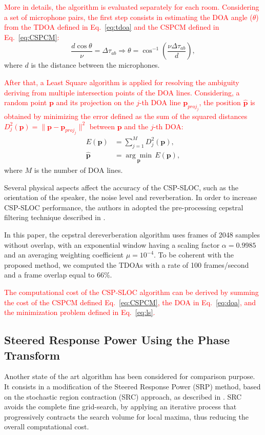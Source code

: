 \documentclass[review]{elsarticle}
\let\originaleqref=\eqref
\renewcommand{\eqref}{Eq.~\originaleqref}
\begin{document}
\textcolor{red}{More in details, the algorithm is evaluated separately for each room. Considering a set of microphone pairs, the first step consists in 
estimating the DOA angle ($\theta$) from the TDOA defined in \eqref{eq:tdoa} and the CSPCM defined in \eqref{eq:CSPCM}:}
\begin{equation}\label{eq:doa}
\frac{d \cos \theta}{\nu} = \Delta\tau_{ab}  \Rightarrow \theta = \cos^{-1}  \left( \frac{\nu \Delta\tau_{ab} }{d} \right), 
\end{equation}
where $d$ is the distance between the microphones.

\textcolor{red}{After that, a Least Square algorithm is applied for resolving the ambiguity deriving from multiple intersection points of the DOA lines.  Considering, a random point $\mathbf{p}$ and its projection on the $j$-th DOA line $\mathbf{p}_{proj_j}$, the position $\hat{\mathbf{p}}$ is obtained by minimizing the error defined as the sum of the squared distances $D^2_j(\mathbf{p}) = \|\mathbf{p}-\mathbf{p}_{proj_j}\|^2$ between $\mathbf{p}$ and the $j$-th DOA:}
\begin{align}
E(\mathbf{p}) &= \sum_{j=1}^M D^2_j (\mathbf{p}),\\
\hat{\mathbf{p}} & =  \underset{\mathbf{p}} {\arg \min} \,E(\mathbf{p}), \label{eq:ls}
\end{align}
where $M$ is the number of DOA lines.

Several physical aspects affect the accuracy of the CSP-SLOC, such as the orientation of the speaker, the noise level and reverberation. In order to increase CSP-SLOC performance, the authors in \cite{tsiami2014experiments} adopted the pre-processing cepstral filtering technique described in \cite{stephenne1997new}. 

In this paper, the cepstral dereverberation algorithm uses frames of 2048 samples without overlap, with an exponential window having a scaling factor $\alpha = 0.9985$ and an averaging weighting coefficient $\mu=10^{-4}$. To be coherent with the proposed method, we computed the TDOAs with a rate of 100 frames/second and a frame overlap equal to 66\%.

\textcolor{red}{The computational cost of the CSP-SLOC algorithm can be derived by summing the cost of the CSPCM defined \eqref{eq:CSPCM}, the DOA in \eqref{eq:doa}, and the minimization problem defined in \eqref{eq:ls}. }


\subsection{Steered Response Power Using the Phase Transform}
Another state of the art algorithm has been considered for comparison purpose. It consists in a modification of the Steered Response Power (SRP) method, based on the stochastic region contraction (SRC) approach, as described in \cite{DoSY07}. SRC avoids the complete fine grid-search, by applying an iterative process that progressively contracts the search volume for local maxima, thus reducing the overall computational cost.
\end{document}

